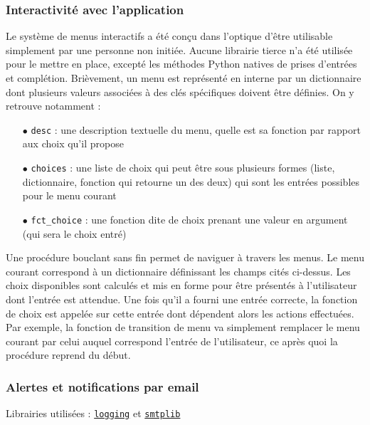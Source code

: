 \documentclass[]{article}
\begin{document}
\subsubsection{Interactivité avec l'application}
\label{justifinter}

Le système de menus interactifs a été conçu dans l'optique d'être utilisable simplement par une personne non initiée. Aucune librairie tierce n'a été utilisée pour le mettre en place, excepté les méthodes Python natives de prises d'entrées et complétion. Brièvement, un menu est représenté en interne par un dictionnaire dont plusieurs valeurs associées à des clés spécifiques doivent être définies. On y retrouve notamment :\\
\begin{itemize}
\item[$\bullet$] \texttt{desc} : une description textuelle du menu, quelle est sa fonction par rapport aux choix qu'il propose
\vspace{0.1cm}
\item[$\bullet$] \texttt{choices} : une liste de choix qui peut être sous plusieurs formes (liste, dictionnaire, fonction qui retourne un des deux) qui sont les entrées possibles pour le menu courant
\vspace{0.1cm}
\item[$\bullet$] \texttt{fct\_choice} : une fonction dite de choix prenant une valeur en argument (qui sera le choix entré)
\end{itemize}
\vspace{0.2cm}

Une procédure bouclant sans fin permet de naviguer à travers les menus. Le menu courant correspond à un dictionnaire définissant les champs cités ci-dessus. Les choix disponibles sont calculés et mis en forme pour être présentés à l'utilisateur dont l'entrée est attendue. Une fois qu'il a fourni une entrée correcte, la fonction de choix est appelée sur cette entrée dont dépendent alors les actions effectuées. Par exemple, la fonction de transition de menu va simplement remplacer le menu courant par celui auquel correspond l'entrée de l'utilisateur, ce après quoi la procédure reprend du début.

\subsubsection{Alertes et notifications par email}

\noindent Librairies utilisées : \href{https://docs.python.org/3/howto/logging.html}{\texttt{logging}} et \href{https://docs.python.org/3/library/smtplib.html}{\texttt{smtplib}}\\
\end{document}
